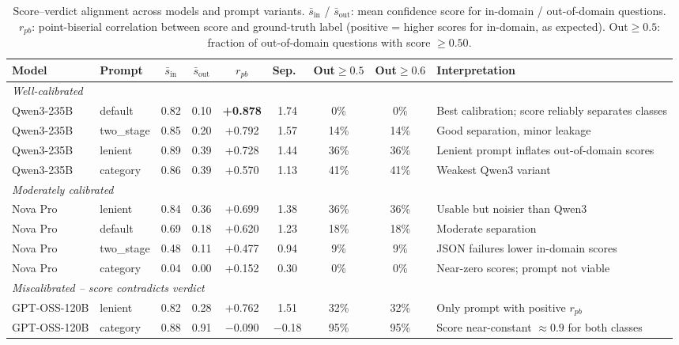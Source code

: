 
\begin{table}[ht]
\centering
\caption{Score--verdict alignment across models and prompt variants.
$\bar{s}_\text{in}$ / $\bar{s}_\text{out}$: mean confidence score for
in-domain / out-of-domain questions.
$r_{pb}$: point-biserial correlation between score and ground-truth label
(positive = higher scores for in-domain, as expected).
Out${\geq}0.5$: fraction of out-of-domain questions with score $\geq 0.50$.}
\label{tab:score-verdict-alignment}
\small
\begin{tabular}{llccccccp{3.8cm}}
\toprule
Model & Prompt & $\bar{s}_\text{in}$ & $\bar{s}_\text{out}$ &
  $r_{pb}$ & Sep.\ & Out${\geq}0.5$ & Out${\geq}0.6$ & Interpretation \\
\midrule
\multicolumn{9}{l}{\textit{Well-calibrated}} \\
\midrule
Qwen3-235B & default      & 0.82 & 0.10 & \textbf{+0.878} & 1.74 &  0\% &  0\% & Best calibration; score reliably separates classes \\
Qwen3-235B & two\_stage   & 0.85 & 0.20 & +0.792 & 1.57 & 14\% & 14\% & Good separation, minor leakage \\
Qwen3-235B & lenient      & 0.89 & 0.39 & +0.728 & 1.44 & 36\% & 36\% & Lenient prompt inflates out-of-domain scores \\
Qwen3-235B & category     & 0.86 & 0.39 & +0.570 & 1.13 & 41\% & 41\% & Weakest Qwen3 variant \\
\midrule
\multicolumn{9}{l}{\textit{Moderately calibrated}} \\
\midrule
Nova Pro & lenient         & 0.84 & 0.36 & +0.699 & 1.38 & 36\% & 36\% & Usable but noisier than Qwen3 \\
Nova Pro & default         & 0.69 & 0.18 & +0.620 & 1.23 & 18\% & 18\% & Moderate separation \\
Nova Pro & two\_stage      & 0.48 & 0.11 & +0.477 & 0.94 &  9\% &  9\% & JSON failures lower in-domain scores \\
Nova Pro & category        & 0.04 & 0.00 & +0.152 & 0.30 &  0\% &  0\% & Near-zero scores; prompt not viable \\
\midrule
\multicolumn{9}{l}{\textit{Miscalibrated -- score contradicts verdict}} \\
\midrule
GPT-OSS-120B & lenient     & 0.82 & 0.28 & +0.762 & 1.51 & 32\% & 32\% & Only prompt with positive $r_{pb}$ \\
GPT-OSS-120B & category    & 0.88 & 0.91 & $-$0.090 & $-$0.18 & 95\% & 95\% & Score near-constant ${\approx}0.9$ for both classes \\

\end{tabular}
\end{table}
